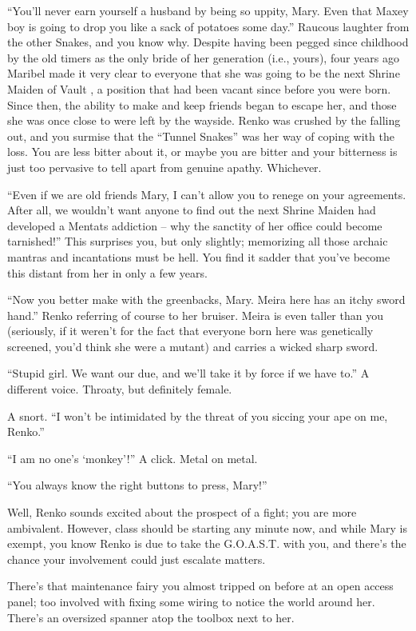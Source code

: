 \documentclass[a4paper,12pt]{book}
\newcommand{\maru}[1]{\raisebox{.5pt}{\textcircled{\raisebox{-.9pt} {#1}}}}
\newcommand{\vaultnine}{Vault \maru{9}}
\begin{document}
``You'll never earn yourself a husband by being so uppity, Mary. Even that Maxey boy is going to drop you like a sack of potatoes some day.'' Raucous laughter from the other Snakes, and you know why. Despite having been pegged since childhood by the old timers as the only bride of her generation (i.e., yours), four years ago Maribel made it very clear to everyone that she was going to be the next Shrine Maiden of \vaultnine, a position that had been vacant since before you were born. Since then, the ability to make and keep friends began to escape her, and those she was once close to were left by the wayside. Renko was crushed by the falling out, and you surmise that the ``Tunnel Snakes'' was her way of coping with the loss. You are less bitter about it, or maybe you are bitter and your bitterness is just too pervasive to tell apart from genuine apathy. Whichever.

``Even if we are old friends Mary, I can't allow you to renege on your agreements. After all, we wouldn't want anyone to find out the next Shrine Maiden had developed a Mentats addiction -- why the sanctity of her office could become tarnished!'' This surprises you, but only slightly; memorizing all those archaic mantras and incantations must be hell. You find it sadder that you've become this distant from her in only a few years.

``Now you better make with the greenbacks, Mary. Meira here has an itchy sword hand.'' Renko referring of course to her bruiser. Meira is even taller than you (seriously, if it weren't for the fact that everyone born here was genetically screened, you'd think she were a mutant) and carries a wicked sharp sword.

``Stupid girl. We want our due, and we'll take it by force if we have to.'' A different voice. Throaty, but definitely female.

A snort. ``I won't be intimidated by the threat of you siccing your ape on me, Renko.''

``I am no one's ‘monkey'!'' A click. Metal on metal.

``You always know the right buttons to press, Mary!''

Well, Renko sounds excited about the prospect of a fight; you are more ambivalent. However, class should be starting any minute now, and while Mary is exempt, you know Renko is due to take the G.O.A.S.T. with you, and there's the chance your involvement could just escalate matters.

There's that maintenance fairy you almost tripped on before at an open access panel; too involved with fixing some wiring to notice the world around her. There's an oversized spanner atop the toolbox next to her.
\end{document}
